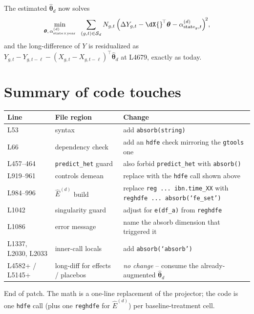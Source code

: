 \documentclass[11pt]{article}
\newcommand{\code}[1]{\texttt{\small #1}}
\newcommand{\1}{\mathbb{1}}
\newcommand{\Smpl}{\mathcal{S}}
\newcommand{\thetad}{\widehat{\bm{\theta}}_d}
\newcommand{\Ngt}{N_{g,t}}
\newcommand{\dY}{\Delta Y_{g,t}}
\begin{document}
\noindent
The estimated $\thetad$ now solves
\[
\min_{\bm{\theta},\,\alpha_{\text{state}\times\text{year}}^{(d)}}\;\;
\sum_{(g,t)\in\Smpl_d} \Ngt\,\Bigl(\dY - \dX{}^{\!\top}\bm{\theta} - \alpha^{(d)}_{\mathrm{state}_g,t}\Bigr)^{\!2},
\]
and the long-difference of $Y$ is residualized as
$Y_{g,t} - Y_{g,t-\ell} - (X_{g,t} - X_{g,t-\ell})^{\!\top}\thetad$ at L4679,
exactly as today.

\section{Summary of code touches}

\begin{tabular}{@{}p{2.4cm}p{4.0cm}p{8.6cm}@{}}
\toprule
\textbf{Line} & \textbf{File region} & \textbf{Change} \\
\midrule
L53 & syntax & add \code{absorb(string)} \\
L66 & dependency check & add an \code{hdfe} check mirroring the \code{gtools} one \\
L457--464 & \code{predict\_het} guard & also forbid \code{predict\_het} with \code{absorb()} \\
L919--961 & controls demean & replace with the \code{hdfe} call shown above \\
L984--996 & $\widehat{E}^{(d)}$ build & replace \code{reg ... ibn.time\_XX} with \code{reghdfe ... absorb(`fe\_set')} \\
L1042 & singularity guard & adjust for \code{e(df\_a)} from \code{reghdfe} \\
L1086 & error message & name the absorb dimension that triggered it \\
L1337, L2030, L2033 & inner-call locals & add \code{absorb(`absorb')} \\
L4582+ / L5145+ & long-diff for effects / placebos & \emph{no change} -- consume the already-augmented $\thetad$ \\
\bottomrule
\end{tabular}

\medskip\noindent
End of patch. The math is a one-line replacement of the projector; the code
is one \code{hdfe} call (plus one \code{reghdfe} for $\widehat{E}^{(d)}$) per
baseline-treatment cell.
\end{document}
